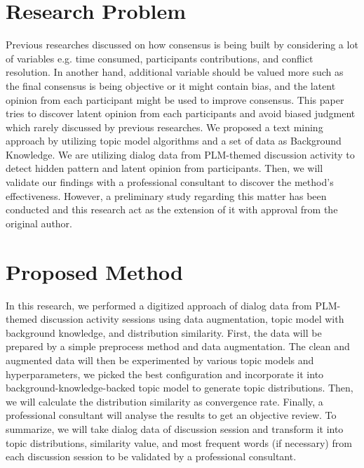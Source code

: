\documentclass[10pt, conference, compsocconf]{IEEEtran}
\begin{document}
\section{Research Problem}
\label{sec_rp}
Previous researches discussed on how consensus is being built by considering  a lot of variables e.g. time consumed, participants contributions, and conflict resolution. In another hand, additional variable should be valued more such as the final consensus is being objective or it might contain bias, and the latent opinion from each participant might be used to improve consensus. This paper tries to discover latent opinion from each participants and avoid biased judgment which rarely discussed by previous researches. We proposed a text mining approach by utilizing topic model algorithms and a set of data as Background Knowledge. We are utilizing dialog data from PLM-themed discussion activity to detect hidden pattern and latent opinion from participants. Then, we will validate our findings with a professional consultant to discover the method's effectiveness. However, a preliminary study regarding this matter has been conducted\cite{b4} and this research act as the extension of it with approval from the original author.




\section{Proposed Method}
In this research, we performed a digitized approach of dialog data from PLM-themed discussion activity sessions using data augmentation, topic model with background knowledge, and distribution similarity. First, the data will be prepared by a simple preprocess method and data augmentation. The clean and augmented data will then be experimented by various topic models and hyperparameters, we picked the best configuration and incorporate it into background-knowledge-backed topic model to generate topic distributions. Then, we will calculate the distribution similarity as convergence rate. Finally, a professional consultant will analyse the results to get an objective review. To summarize, we will take dialog data of discussion session and transform it into topic distributions, similarity value, and most frequent words (if necessary) from each discussion session to be validated by a professional consultant.
\end{document}
